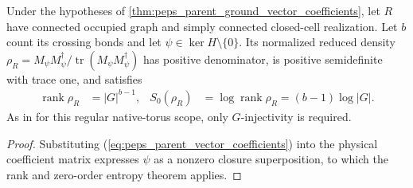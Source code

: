 \begin{lemma}%
    \label{thm:peps_parent_ground_state_zero_entropy}
    \leanok
    Under the hypotheses of \ref{thm:peps_parent_ground_vector_coefficients},
    let $R$ have connected occupied graph and simply connected closed-cell
    realization. Let $b$ count its crossing bonds and let
    $\psi\in\ker H\setminus\{0\}$. Its normalized reduced density
    $\rho_R=M_\psi M_\psi^\dagger/\operatorname{tr}(M_\psi M_\psi^\dagger)$
    has positive denominator, is positive semidefinite with trace one,
    and satisfies
    \begin{align}
        \operatorname{rank}\rho_R & =|G|^{b-1},
                                  & S_0(\rho_R) & =\log\operatorname{rank}\rho_R=(b-1)\log|G|.
    \end{align}
    As in \cite[Corollary~6.10]{Schuch2010PEPS} for this regular native-torus scope,
    only $G$-injectivity is required.
\end{lemma}
\begin{proof}\leanok
    Substituting (\ref{eq:peps_parent_vector_coefficients}) into the
    physical coefficient matrix expresses $\psi$ as a nonzero closure superposition, to which the rank and zero-order
    entropy theorem applies.
\end{proof}
